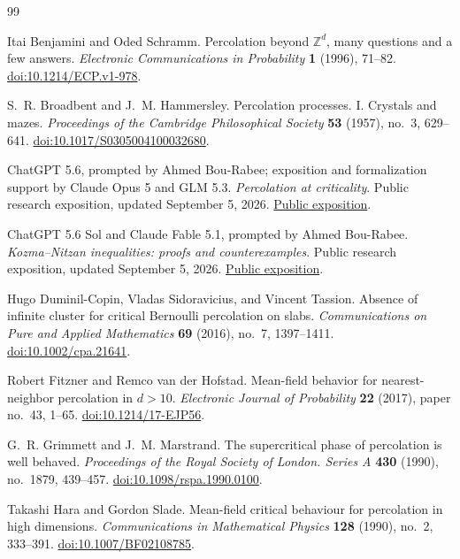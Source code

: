 \begin{thebibliography}{99}
\raggedright

Itai Benjamini and Oded Schramm.
Percolation beyond $\mathbb Z^d$, many questions and a few answers.
\emph{Electronic Communications in Probability} \textbf{1} (1996), 71--82.
\href{https://doi.org/10.1214/ECP.v1-978}{doi:10.1214/ECP.v1-978}.

S.~R. Broadbent and J.~M. Hammersley.
Percolation processes. I. Crystals and mazes.
\emph{Proceedings of the Cambridge Philosophical Society}
\textbf{53} (1957), no.~3, 629--641.
\href{https://doi.org/10.1017/S0305004100032680}{doi:10.1017/S0305004100032680}.

ChatGPT 5.6, prompted by Ahmed Bou-Rabee;
exposition and formalization support by Claude Opus 5 and GLM 5.3.
\emph{Percolation at criticality}.
Public research exposition, updated September 5, 2026.
\href{https://nitromannitol.github.io/site-percolation-7d3f2/}{Public exposition}.

ChatGPT 5.6 Sol and Claude Fable 5.1, prompted by Ahmed Bou-Rabee.
\emph{Kozma--Nitzan inequalities: proofs and counterexamples}.
Public research exposition, updated September 5, 2026.
\href{https://nitromannitol.github.io/kn1-verification-b80e9/}{Public exposition}.

Hugo Duminil-Copin, Vladas Sidoravicius, and Vincent Tassion.
Absence of infinite cluster for critical Bernoulli percolation on slabs.
\emph{Communications on Pure and Applied Mathematics}
\textbf{69} (2016), no.~7, 1397--1411.
\href{https://doi.org/10.1002/cpa.21641}{doi:10.1002/cpa.21641}.

Robert Fitzner and Remco van der Hofstad.
Mean-field behavior for nearest-neighbor percolation in $d>10$.
\emph{Electronic Journal of Probability} \textbf{22} (2017), paper no.~43, 1--65.
\href{https://doi.org/10.1214/17-EJP56}{doi:10.1214/17-EJP56}.

G.~R. Grimmett and J.~M. Marstrand.
The supercritical phase of percolation is well behaved.
\emph{Proceedings of the Royal Society of London. Series A}
\textbf{430} (1990), no.~1879, 439--457.
\href{https://doi.org/10.1098/rspa.1990.0100}{doi:10.1098/rspa.1990.0100}.

Takashi Hara and Gordon Slade.
Mean-field critical behaviour for percolation in high dimensions.
\emph{Communications in Mathematical Physics}
\textbf{128} (1990), no.~2, 333--391.
\href{https://doi.org/10.1007/BF02108785}{doi:10.1007/BF02108785}.


\end{thebibliography}
